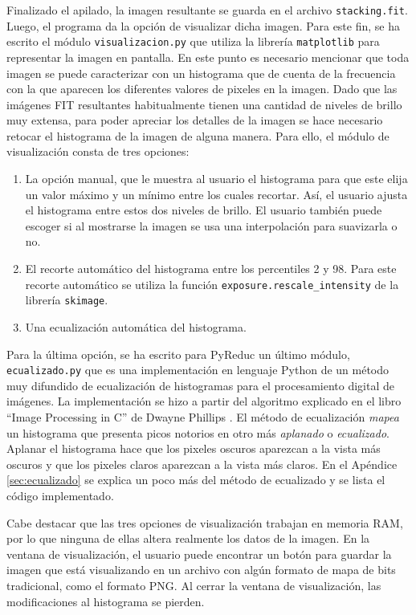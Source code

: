 \documentclass[a4paper, 12pt]{article}
\begin{document}
Finalizado el apilado, la imagen resultante se guarda en el archivo \texttt{stacking.fit}. Luego, el programa da la opción de visualizar dicha imagen. Para este fin, se ha escrito el módulo \texttt{visualizacion.py} que utiliza la librería {\tt matplotlib} para representar la imagen en pantalla. En este punto es necesario mencionar que toda imagen se puede caracterizar con un histograma que de cuenta de la frecuencia con la que aparecen los diferentes valores de pixeles en la imagen. Dado que las imágenes FIT resultantes habitualmente tienen una cantidad de niveles de brillo muy extensa, para poder apreciar los detalles de la imagen se hace necesario retocar el histograma de la imagen de alguna manera. Para ello, el módulo de visualización consta de tres opciones:
\begin{enumerate}
\item La opción manual, que le muestra al usuario el histograma para que este elija un valor máximo y un mínimo entre los cuales recortar. Así, el usuario ajusta el histograma entre estos dos niveles de brillo. El usuario también puede escoger si al mostrarse la imagen se usa una interpolación para suavizarla o no.
\item El recorte automático del histograma entre los percentiles 2 y 98. Para este recorte automático se utiliza la función {\tt exposure.rescale\_intensity} de la librería {\tt skimage}.
\item Una ecualización automática del histograma.
\end{enumerate}

Para la última opción, se ha escrito para PyReduc un último módulo, {\tt ecualizado.py} que es una implementación en lenguaje Python de un método muy difundido de ecualización de histogramas para el procesamiento digital de imágenes. La implementación se hizo a partir del algoritmo explicado en el libro ``Image Processing in C'' de Dwayne Phillips \cite{phillips}. El método de ecualización {\it mapea} un histograma que presenta picos notorios en otro más {\it aplanado} o {\it ecualizado}. Aplanar el histograma hace que los pixeles oscuros aparezcan a la vista más oscuros y que los pixeles claros aparezcan a la vista más claros. En el Apéndice \ref{sec:ecualizado} se explica un poco más del método de ecualizado y se lista el código implementado.


Cabe destacar que las tres opciones de visualización trabajan en memoria RAM, por lo que ninguna de ellas altera realmente los datos de la imagen. En la ventana de visualización, el usuario puede encontrar un botón para guardar la imagen que está visualizando en un archivo con algún formato de mapa de bits tradicional, como el formato PNG. Al cerrar la ventana de visualización, las modificaciones al histograma se pierden.
\end{document}

